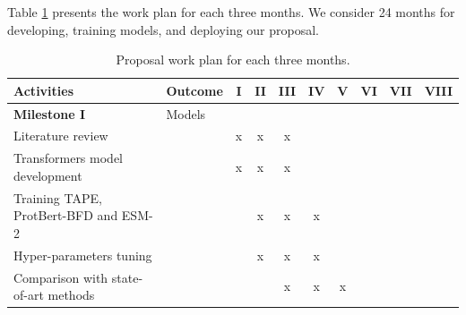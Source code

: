 \documentclass[a4paper,11pt]{article}
\begin{document}
Table \ref{tab:plan} presents the work plan for each three months. We consider 24 months for developing, training models, and deploying our proposal. 

\begin{table}[H]
	\centering
	\setlength{\tabcolsep}{0.5em} %
	{\renewcommand{\arraystretch}{1.2}%
		\caption{Proposal work plan for each three months.}
		\label{tab:plan}
		\begin{tabular}{|p{7.4cm}|p{2.3cm}|c|c|c|c|c|c|c|c|} \hline
			\textbf{Activities}                                  &   \textbf{Outcome}         & I & II & III & IV & V & VI & VII & VIII \\ \hline
			
			\textbf{Milestone I} &  Models & & & & & & & &\\
			Literature review       &                       & x                     & x                      & x                       &                       &                       &                        &  &                                                \\
			Transformers model development  &                           &       x                &           x             &                x         &                       &                       &                        &              &                                  \\
			Training TAPE, ProtBert-BFD and ESM-2  &                           &                       &           x             &                x         & x                      &                       &                        &              &                                  \\
			Hyper-parameters tuning  &                           &                       &           x             &                x         & x                      &                       &                        &              &                                  \\
			Comparison with state-of-art methods &    &                       &                        & x                       & x                      & x                     &                        &            &                                       \\ \hline
			

\end{tabular}}
\end{table}
\end{document}
